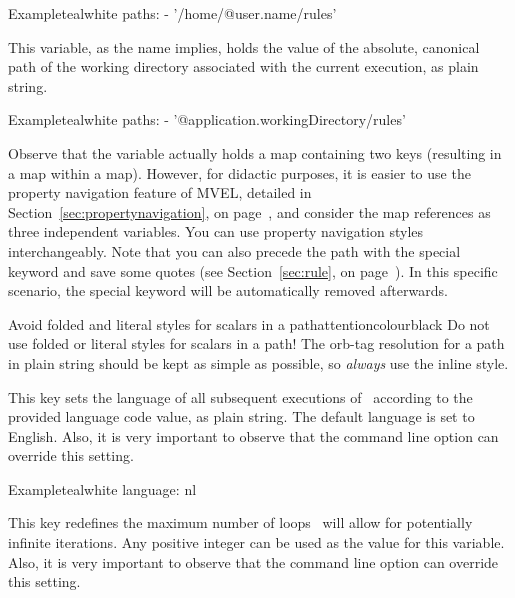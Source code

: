 \begin{description}
\begin{description}
\begin{codebox}{Example}{teal}{\icnote}{white}
paths:
- '/home/@{user.name}/rules'
\end{codebox}

\item[\varbox{application.workingDirectory}] This variable, as the name implies, holds the value of the absolute, canonical path of the working directory associated with the current execution, as plain string.

\begin{codebox}{Example}{teal}{\icnote}{white}
paths:
- '@{application.workingDirectory}/rules'
\end{codebox}
\end{description}

Observe that the  variable actually holds a map containing two keys (resulting in a map within a map). However, for didactic purposes, it is easier to use the property navigation feature of \gls{MVEL}, detailed in Section~\ref{sec:propertynavigation}, on page~\pageref{sec:propertynavigation}, and consider the map references as three independent variables. You can use property navigation styles interchangeably. Note that you can also precede the path with the special keyword  and save some quotes (see Section~\ref{sec:rule}, on page~\pageref{sec:rule}). In this specific scenario, the special keyword will be automatically removed afterwards.

\begin{messagebox}{Avoid folded and literal styles for scalars in a path}{attentioncolour}{\icattention}{black}
Do not use folded or literal styles for scalars in a path! The \gls{orb-tag} resolution for a path in plain string should be kept as simple as possible, so \emph{always} use the inline style.
\end{messagebox}

\item[\describecf{O}{string}{language}{en}] This key sets the language of all subsequent executions of \arara\ according to the provided language code value, as plain string. The default language is set to English. Also, it is very important to observe that the  command line option can override this setting.

\begin{codebox}{Example}{teal}{\icnote}{white}
language: nl
\end{codebox}

\item[\describecf{O}{integer}{loops}{10}] This key redefines the maximum number of loops \arara\ will allow for potentially infinite iterations. Any positive integer can be used as the value for this variable. Also, it is very important to observe that the  command line option can override this setting.


\end{description}
